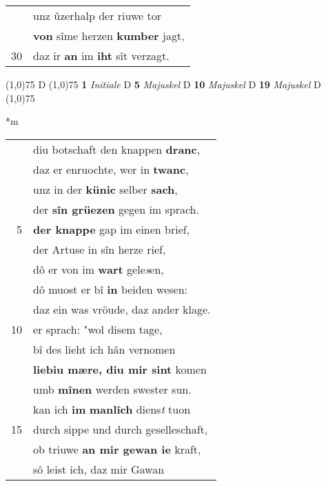 \documentclass[8pt,a4paper,notitlepage]{article}
\begin{document}
\begin{table}[ht]
\begin{minipage}[t]{0.5\linewidth}
\begin{tabular}{rl}
 & unz ûzerhalp der riuwe tor\\ 
 & \textbf{von} sîme herzen \textbf{kumber} jagt,\\ 
30 & daz ir \textbf{an} im \textbf{iht} sît verzagt.\\ 
\end{tabular}
\scriptsize
\line(1,0){75} \newline
D \newline
\line(1,0){75} \newline
\textbf{1} \textit{Initiale} D  \textbf{5} \textit{Majuskel} D  \textbf{10} \textit{Majuskel} D  \textbf{19} \textit{Majuskel} D  \newline
\line(1,0){75} \newline
\newline
\end{minipage}
\hspace{0.5cm}
\begin{minipage}[t]{0.5\linewidth}
\small
\begin{center}*m
\end{center}
\begin{tabular}{rl}
 & diu botschaft den knappen \textbf{dranc},\\ 
 & daz er enruochte, wer in \textbf{twanc},\\ 
 & unz in der \textbf{künic} selber \textbf{sach},\\ 
 & der \textbf{sîn grüezen} gegen im sprach.\\ 
5 & \textbf{der knappe} gap im einen brief,\\ 
 & der Artuse in sîn herze rief,\\ 
 & dô er von im \textbf{wart} gele\textit{s}en,\\ 
 & dô muost er bî \textbf{in} beiden wesen:\\ 
 & daz ein was vröude, daz ander klage.\\ 
10 & er sprach: "wol disem tage,\\ 
 & bî des lieht ich hân vernomen\\ 
 & \textbf{liebiu mære, diu mir sint} komen\\ 
 & umb \textbf{mînen} werden swester sun.\\ 
 & kan ich \textbf{im} \textbf{manlîch} diens\textit{t} tuon\\ 
15 & durch sippe und durch geselleschaft,\\ 
 & ob triuwe \textbf{an mir gewan ie} kraft,\\ 
 & sô leist ich, daz mir Gawan\\ 

\end{tabular}
\end{minipage}
\end{table}
\end{document}
